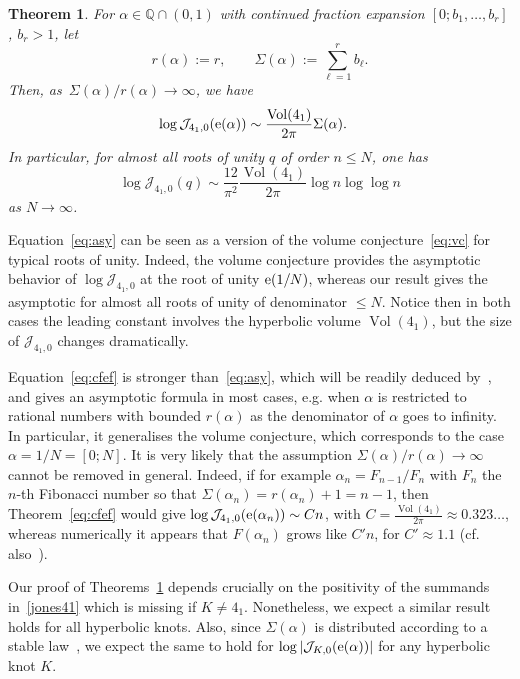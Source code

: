 \documentclass[11pt]{amsart}
\newcommand{\Q}{\mathbb{Q}}
\newcommand{\Sm}{\Sigma}
\newcommand{\J}{\mathcal{J}}
\newtheorem{theo}{Theorem}
\theoremstyle{definition}
\newcommand{\pr}[1]{\mathchoice{\left( #1\right)}{(#1)}{(#1)}{(#1)}}
\newcommand{\e}[1][]{\ifthenelse{\equal{#1}{}}{{\rm e}}{\operatorname{e}\pr{ #1}}}
\DeclareMathOperator{\Vol}{Vol}
\newcommand{\1}{{\mathbf 1}}
\let\originalleft\left
\let\originalright\right
\renewcommand{\left}{\mathopen{}\mathclose\bgroup\originalleft}
\renewcommand{\right}{\aftergroup\egroup\originalright}
\numberwithin{equation}{section}
\begin{document}
\begin{theo}\label{theo:cfep}
For $\alpha\in\Q\cap(0,1)$ with continued fraction expansion   $[0;b_1,\dots,b_r]$,  $b_r>1$, let 
$$ r(\alpha):=r,\qquad \Sm(\alpha):=\sum_{\ell=1}^rb_\ell.$$
Then, as~$\Sigma(\alpha)/r(\alpha)\to\infty$, we have
  \begin{equation}\label{eq:cfef}\begin{aligned}
      \log \J_{4_1,0}(\e[\alpha])&\sim \frac{\Vol(4_1)}{2\pi} \Sm(\alpha).
    \end{aligned}\end{equation}
In particular, for almost all roots of unity $q$ of order $n\leq N$, one has
  \begin{equation}\label{eq:asy}
    \log \J_{4_1,0}(q) \sim  \frac{12 }{\pi^2}\frac{\Vol(4_1)}{2\pi}\log n \log \log n
  \end{equation}
  as $N\to\infty$.

\end{theo}
Equation~\eqref{eq:asy} can be seen as a version of the volume conjecture~\eqref{eq:vc} for typical roots of unity. Indeed, the volume conjecture provides the asymptotic behavior of $\log \J_{4_1,0}$ at the root of unity $\e[1/N]$, whereas our result gives the asymptotic for almost all roots of unity of denominator $\leq N$. Notice then in both cases the leading constant involves the hyperbolic volume $\Vol(4_1)$, but the size of $\J_{4_1,0}$ changes dramatically.

Equation~\eqref{eq:cfef} is stronger than~\eqref{eq:asy}, which will be readily deduced by~\cite{BettinDrappeau}, and gives an asymptotic formula in most cases, e.g. when $\alpha$ is restricted to rational numbers with bounded $r(\alpha)$ as the denominator of $\alpha$ goes to infinity. In particular, it generalises the volume conjecture, which corresponds to the case $\alpha=1/N=[0;N]$. It is very likely that the assumption $\Sm(\alpha)/r(\alpha)\to\infty$ cannot be removed in general. Indeed, if for example $\alpha_n=F_{n-1}/F_{n}$ with $F_n$ the $n$-th Fibonacci number so that $\Sm(\alpha_n)=r(\alpha_n)+1=n-1$, then Theorem~\ref{eq:cfef} would give $\log \J_{4_1,0}(\e[\alpha_n])\sim C n$, with $C=\frac{\Vol(4_1)}{2\pi}\approx 0.323\dots$, whereas numerically it appears that $F(\alpha_n)$ grows like $C' n$, for $C'\approx 1.1$ (cf. also~\cite[Figure~6]{Zagier2010}).

\medskip 
Our proof of Theorems~\ref{theo:cfep} depends crucially on the positivity of the summands in~\eqref{jones41} which is missing if $K\neq 4_1$. Nonetheless, we expect a similar result holds for all hyperbolic knots. Also, since $\Sm(\alpha)$ is distributed according to a stable law~\cite{BettinDrappeau}, we expect the same to hold for $\log |\J_{K,0}(\e[\alpha])|$ for any hyperbolic knot $K$.
\end{document}
